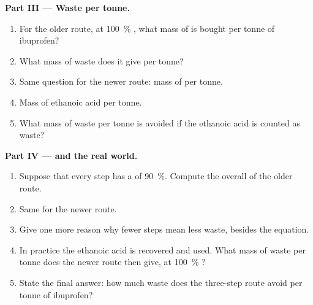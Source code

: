 \begin{problem}
\medskip
\noindent\textbf{Part III --- Waste per tonne.}
\begin{enumerate}[resume]
  \item For the older route, at \qty{100}{\percent} , what mass of
         is bought per tonne of ibuprofen?
  \item What mass of waste does it give per tonne?
  \item Same question for the newer route: mass of  per tonne.
  \item Mass of ethanoic acid per tonne.
  \item What mass of waste per tonne is avoided if the ethanoic acid is
        counted as waste?
\end{enumerate}

\medskip
\noindent\textbf{Part IV ---  and the real world.}
\begin{enumerate}[resume]
  \item Suppose that every step has a  of \qty{90}{\percent}.
        Compute the overall  of the older route.
  \item Same for the newer route.
  \item Give one more reason why fewer steps mean less waste, besides the
        equation.
  \item In practice the ethanoic acid is recovered and used. What mass of
        waste per tonne does the newer route then give, at
        \qty{100}{\percent} ?
  \item State the final answer: how much waste does the three-step route
        avoid per tonne of ibuprofen?
\end{enumerate}
\end{problem}
